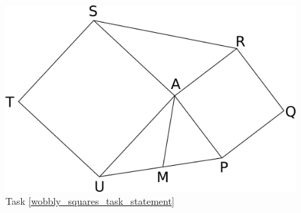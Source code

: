 \documentclass{article}
\begin{document}
\begin{enumerate}
    \begin{figure}[ht]      
      \includegraphics{geometry1_3}
      \caption{Task \ref{wobbly_squares_task_statement}} \label{wobbly_squares_task}
    \end{figure}
  \end{enumerate}
\end{document}
